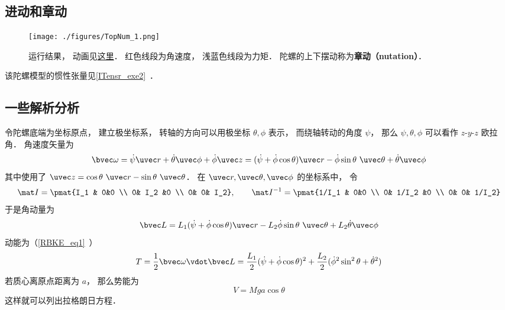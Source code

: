 
\begin{issues}
\issueDraft
\end{issues}


\subsection{进动和章动}

\begin{figure}[ht]
\centering
\texttt{[image: ./figures/TopNum\_1.png]}
\caption{运行结果， 动画见\href{https://wuli.wiki/apps/Top.html}{这里}． 红色线段为角速度， 浅蓝色线段为力矩． 陀螺的上下摆动称为\textbf{章动（nutation）}．} \label{TopNum_fig1}
\end{figure}

该陀螺模型的惯性张量见\autoref{ITensr_exe2}~．

\subsection{一些解析分析}
令陀螺底端为坐标原点， 建立极坐标系， 转轴的方向可以用极坐标 $\theta, \phi$ 表示， 而绕轴转动的角度 $\psi$， 那么 $\psi, \theta, \phi$ 可以看作 $z$-$y$-$z$ 欧拉角． 角速度矢量为
\begin{equation}
\bvec\omega
= \dot\psi\uvec r + \dot\theta\uvec\phi + \dot\phi\uvec z
= (\dot\psi + \dot\phi\cos\theta)\uvec r - \dot\phi\sin\theta\ \uvec\theta +
 \dot\theta\uvec\phi
\end{equation}
其中使用了 $\uvec z = \cos\theta\ \uvec r - \sin\theta\ \uvec\theta$． 在 $\uvec r, \uvec\theta, \uvec \phi$ 的坐标系中， 令
\begin{equation}
\mat I = \pmat{I_1 & 0&0 \\ 0& I_2 &0 \\ 0& 0& I_2}, \qquad
\mat I^{-1} = \pmat{1/I_1 & 0&0 \\ 0& 1/I_2 &0 \\ 0& 0& 1/I_2}
\end{equation}
于是角动量为
\begin{equation}
\bvec L = L_1(\dot\psi + \dot\phi\cos\theta)\uvec r - L_2\dot\phi\sin\theta\ \uvec\theta + L_2\dot\theta\uvec\phi
\end{equation}
动能为（\autoref{RBKE_eq1}~）
\begin{equation}
T = \frac{1}{2}\bvec\omega\vdot\bvec L = \frac{L_1}{2}(\dot\psi + \dot\phi\cos\theta)^2 + \frac{L_2}{2}(\dot\phi^2\sin^2\theta + \dot\theta^2)
\end{equation}
若质心离原点距离为 $a$， 那么势能为
\begin{equation}
V = Mga\cos\theta
\end{equation}
这样就可以列出拉格朗日方程．

